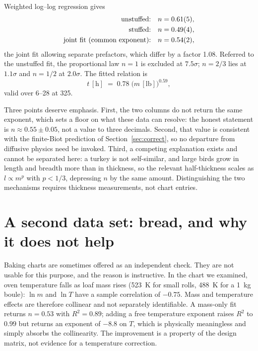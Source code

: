 Weighted log--log regression gives
\begin{align}
\text{unstuffed:}\quad & n = \num{0.61 \pm 0.05},\\
\text{stuffed:}\quad & n = \num{0.49 \pm 0.04},\\
\text{joint fit (common exponent):}\quad & n = \num{0.54 \pm 0.02},
\end{align}
the joint fit allowing separate prefactors, which differ by a factor
\num{1.08}. Referred to the unstuffed fit, the proportional law $n=1$ is
excluded at $7.5\sigma$; $n=2/3$ lies at $1.1\sigma$ and $n=1/2$ at
$2.0\sigma$. The fitted relation is
\begin{equation}
t\,[\mathrm{h}] \;=\; 0.78\;\bigl(m\,[\mathrm{lb}]\bigr)^{0.59},
\label{eq:fit}
\end{equation}
valid over \SIrange{6}{28}{\pound} at \SI{325}{\degreeFahrenheit}.

Three points deserve emphasis. First, the two columns do not return the
same exponent, which sets a floor on what these data can resolve: the
honest statement is $n \approx 0.55 \pm 0.05$, not a value to three
decimals. Second, that value is consistent with the finite-Biot prediction
of Section~\ref{sec:correct}, so no departure from diffusive physics need
be invoked. Third, a competing explanation exists and cannot be separated
here: a turkey is not self-similar, and large birds grow in length and
breadth more than in thickness, so the relevant half-thickness scales as
$l \propto m^{p}$ with $p < 1/3$, depressing $n$ by the same amount.
Distinguishing the two mechanisms requires thickness measurements, not
chart entries.

\section{A second data set: bread, and why it does not help}
\label{sec:bread}

Baking charts \cite{bread} are sometimes offered as an independent check.
They are not usable for this purpose, and the reason is instructive. In
the chart we examined, oven temperature falls as loaf mass rises
(\SI{523}{\kelvin} for small rolls, \SI{488}{\kelvin} for a \SI{1}{\kilo\gram}
boule): $\ln m$ and $\ln T$ have a sample correlation of $-0.75$. Mass and
temperature effects are therefore collinear and not separately
identifiable. A mass-only fit returns $n = 0.53$ with $R^{2}=0.89$; adding
a free temperature exponent raises $R^{2}$ to $0.99$ but returns an
exponent of $-8.8$ on $T$, which is physically meaningless and simply
absorbs the collinearity. The improvement is a property of the design
matrix, not evidence for a temperature correction.

